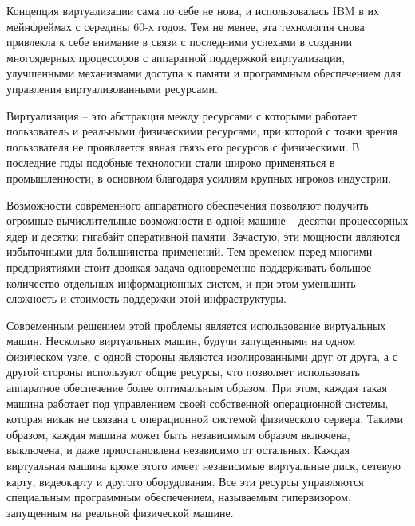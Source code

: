 \intro

Концепция виртуализации сама по себе не нова, и использовалась IBM в их мейнфреймах
с середины 60-х годов. Тем не менее, эта технология снова привлекла к себе внимание
в связи с последними успехами в создании многоядерных процессоров с аппаратной
поддержкой виртуализации, улучшенными механизмами доступа к памяти и 
программным обеспечением для управления виртуализованными ресурсами.

Виртуализация -- это абстракция между ресурсами с которыми работает пользователь
и реальными физическими ресурсами, при которой с точки зрения пользователя 
не проявляется явная связь его ресурсов с физическими.\cite{Carapinha:2009:NVV:1592648.1592660} 
В последние годы подобные технологии
стали широко применяться в промышленности, в основном благодаря усилиям крупных
игроков индустрии.\cite{website:oracle-vt}\cite{website:microsoft-vt}\cite{website:redhat-vt}

Возможности современного аппаратного обеспечения позволяют получить огромные
вычислительные возможности в одной машине -- десятки процессорных ядер и десятки гигабайт оперативной памяти. Зачастую, эти мощности являются избыточными для большинства
применений. Тем временем перед многими предприятиями стоит двоякая задача
одновременно поддерживать большое количество отдельных информационных систем, 
и при этом уменьшить сложность и стоимость поддержки этой инфраструктуры.

Современным решением этой проблемы является использование виртуальных машин.
Несколько виртуальных машин, будучи запущенными на одном физическом узле, 
с одной стороны являются изолированными друг от друга, а с другой стороны используют
общие ресурсы, что позволяет использовать аппаратное обеспечение более оптимальным образом.
При этом, каждая такая машина работает под управлением своей собственной операционной 
системы, которая никак не связана с операционной системой физического сервера.
Такими образом, каждая машина может быть независимым образом включена, выключена,
и даже приостановлена независимо от остальных. Каждая виртуальная машина кроме этого 
имеет независимые виртуальные диск, сетевую карту, видеокарту и другого оборудования.
Все эти ресурсы управляются специальным программным обеспечением, называемым 
гипервизором, запущенным на реальной физической машине.
\cite{Kamoun:2009:VDW:1595422.1595424}

